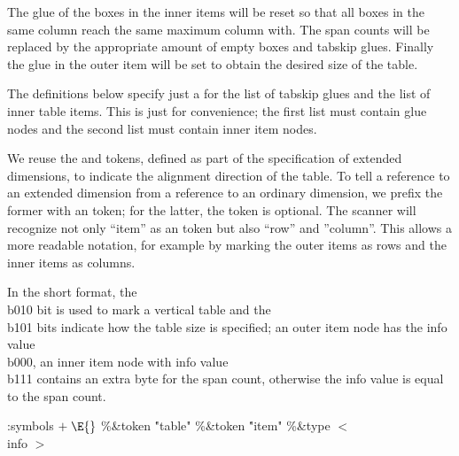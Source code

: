 The glue of the boxes in the inner items will be reset so that all boxes in the same
column reach the same maximum column with.  The span counts will be replaced by
the appropriate amount of empty boxes and tabskip glues.  Finally the
glue in the outer item will be set to obtain the desired size
of the table.

The definitions below specify just a  for the list of tabskip glues and the
list of inner table items. This is just for convenience; the first list must contain glue
nodes and the second list must contain inner item nodes.

We reuse the  and  tokens, defined as part of the specification of extended dimensions,
to indicate the alignment direction of the table. To tell a reference to an extended dimension
from a reference to an ordinary dimension, we prefix the former with an  token;
for the latter, the  token is optional. The scanner will recognize not only ``item'' as
an  token but also ``row'' and ''column''. This allows a more readable notation,
for example by marking the outer items as rows and the inner items as columns.

In the short format, the \\{b010} bit is used to mark a vertical table and the \\{b101} bits indicate
how the table size is specified;
an outer item node has the info value \\{b000}, an inner item node with info value \\{b111}
contains an extra byte for the span count, otherwise the info value is equal to the span count.






\readcode
\Y\par
\par
\par
\Y
\fi


\Y\B\4:symbols\X${}\mathrel+\E{}$\6
\8\%\&{token} \5\.{"table"}\6
\8\%\&{token} \5\.{"item"}\6
\8\%\&{type} $<$ \\{info} $>$ 
\Y
\fi


